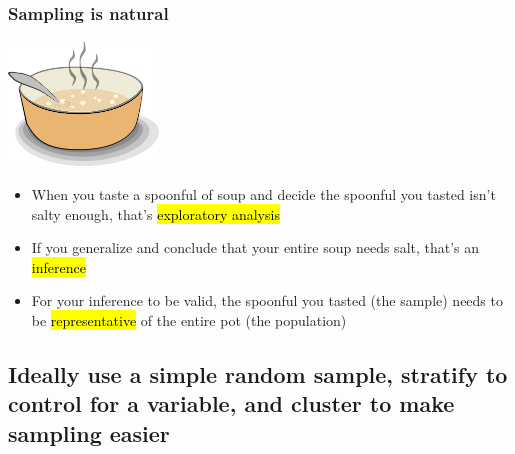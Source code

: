 \documentclass[11pt,containsverbatim,handout,xcolor=xelatex,dvipsnames,table]{beamer}
\begin{document}
\begin{frame}
\frametitle{Sampling is natural}

\begin{center}
\includegraphics[width=0.3\textwidth]{figures/soup}
\end{center}

\begin{itemize}

\item When you taste a spoonful of soup and decide the spoonful you tasted isn't salty enough, that's \hl{exploratory analysis}

\item If you generalize and conclude that your entire soup needs salt, that's an \hl{inference}

\item For your inference to be valid, the spoonful you tasted (the sample) needs to be \hl{representative} of the entire pot (the population)

\end{itemize}

\end{frame}


\subsection{Ideally use a simple random sample, stratify to control for a variable, and cluster to make sampling easier} 
\label{mi2}

\end{document}
